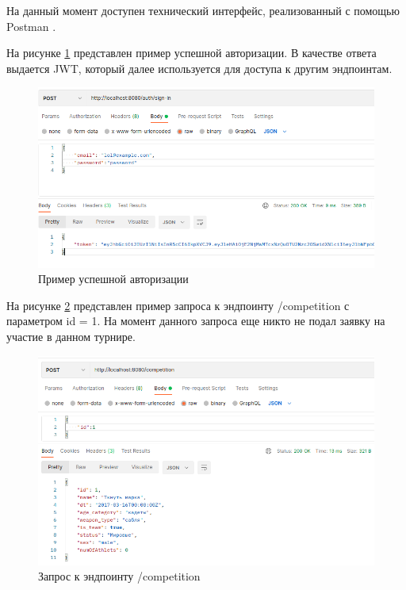 На данный момент доступен технический интерфейс, реализованный с помощью Postman \cite{Postman}.

На рисунке \ref{ris:sign-in} представлен пример успешной авторизации. В качестве ответа выдается JWT, который далее используется для доступа к другим эндпоинтам.

\begin{figure}[H]
	\includegraphics[width=1\columnwidth]{assets/signIn.png}
	\centering
	\caption{Пример успешной авторизации}
	\label{ris:sign-in}
\end{figure}

На рисунке \ref{ris:before} представлен пример запроса к эндпоинту /competition с параметром id = 1. На момент данного запроса еще никто не подал заявку на участие в данном турнире.

\begin{figure}[H]
	\includegraphics[width=1\columnwidth]{assets/before.png}
	\centering
	\caption{Запрос к эндпоинту /competition}
	\label{ris:before}
\end{figure}


